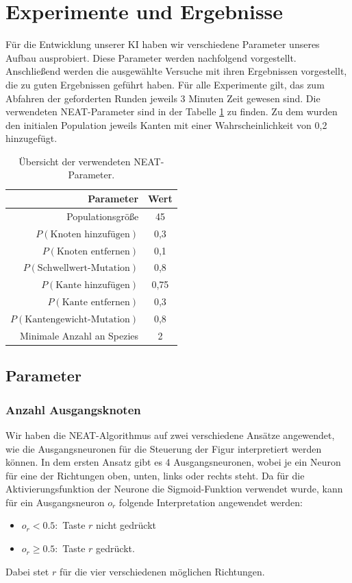 \documentclass[11pt,final,journal,a4paper,towside,towcolumn]{IEEEtran}
\begin{document}
\section{Experimente und Ergebnisse}

Für die Entwicklung unserer \ac{KI} haben wir verschiedene Parameter unseres Aufbau ausprobiert. Diese Parameter werden nachfolgend vorgestellt. Anschließend werden die ausgewählte Versuche mit ihren Ergebnissen vorgestellt, die zu guten Ergebnissen geführt haben.
Für alle Experimente gilt, das zum Abfahren der geforderten Runden jeweils 3 Minuten Zeit gewesen sind. Die verwendeten \ac{NEAT}-Parameter sind in der Tabelle \ref{tab:NEAT} zu finden.
Zu dem wurden den initialen Population jeweils Kanten mit einer Wahrscheinlichkeit von 0,2 hinzugefügt.
\begin{table}
	\caption{Übersicht der verwendeten \ac{NEAT}-Parameter.}
	\label{tab:NEAT}
	\centering
	\begin{tabular}{|r|c|}
		\hline
		Parameter & Wert \\\hline\hline
		Populationsgröße & 45 \\\hline
		$P\left(\textrm{Knoten hinzufügen}\right)$ & 0,3 \\\hline
		$P\left(\textrm{Knoten entfernen}\right)$ & 0,1 \\\hline
		$P\left(\textrm{Schwellwert-Mutation}\right)$ & 0,8 \\\hline
		$P\left(\textrm{Kante hinzufügen}\right)$ & 0,75 \\\hline
		$P\left(\textrm{Kante entfernen}\right)$ & 0,3 \\\hline
		$P\left(\textrm{Kantengewicht-Mutation}\right)$ & 0,8 \\\hline
		Minimale Anzahl an Spezies & 2 \\\hline
	\end{tabular}
\end{table}
\subsection{Parameter}
\subsubsection*{Anzahl Ausgangsknoten}
Wir haben die \ac{NEAT}-Algorithmus auf zwei verschiedene Ansätze angewendet, wie die Ausgangsneuronen für die Steuerung der Figur interpretiert werden können. 
In dem ersten Ansatz gibt es 4 Ausgangsneuronen, wobei je ein Neuron für eine der Richtungen oben, unten, links oder rechts steht. Da für die Aktivierungsfunktion der Neurone die Sigmoid-Funktion verwendet wurde, kann für ein Ausgangsneuron $o_r$ folgende Interpretation angewendet werden:
\begin{itemize}
	\item $o_r < 0.5:$ Taste $r$ nicht gedrückt
	\item $o_r \geq 0.5:$ Taste $r$ gedrückt.
\end{itemize}
Dabei stet $r$ für die vier verschiedenen möglichen Richtungen.
\end{document}
